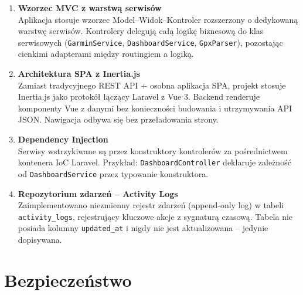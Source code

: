 \documentclass[12pt,a4paper]{report}
\begin{document}
\begin{enumerate}

\item \textbf{Wzorzec MVC z warstwą serwisów} \\
Aplikacja stosuje wzorzec Model--Widok--Kontroler rozszerzony o dedykowaną warstwę serwisów. Kontrolery delegują całą logikę biznesową do klas serwisowych (\texttt{GarminService}, \texttt{DashboardService}, \texttt{GpxParser}), pozostając cienkimi adapterami między routingiem a logiką.

\item \textbf{Architektura SPA z Inertia.js} \\
Zamiast tradycyjnego REST API + osobna aplikacja SPA, projekt stosuje Inertia.js jako protokół łączący Laravel z Vue 3. Backend renderuje komponenty Vue z danymi bez konieczności budowania i utrzymywania API JSON. Nawigacja odbywa się bez przeładowania strony.

\item \textbf{Dependency Injection} \\
Serwisy wstrzykiwane są przez konstruktory kontrolerów za pośrednictwem kontenera IoC Laravel. Przykład: \texttt{DashboardController} deklaruje zależność od \texttt{DashboardService} przez typowanie konstruktora.

\item \textbf{Repozytorium zdarzeń -- Activity Logs} \\
Zaimplementowano niezmienny rejestr zdarzeń (append-only log) w tabeli \texttt{activity\_logs}, rejestrujący kluczowe akcje z sygnaturą czasową. Tabela nie posiada kolumny \texttt{updated\_at} i nigdy nie jest aktualizowana -- jedynie dopisywana.

\end{enumerate}

\section{Bezpieczeństwo}
\end{document}
